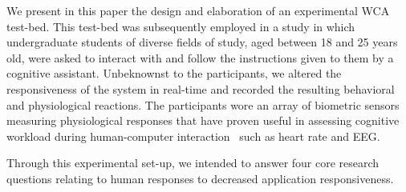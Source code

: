 We present in this paper the design and elaboration of an experimental WCA test-bed.
This test-bed was subsequently employed in a study in which undergraduate students of diverse fields of study, aged between 18 and 25 years old, were asked to interact with and follow the instructions given to them by a cognitive assistant.
Unbeknownst to the participants, we altered the responsiveness of the system in real-time and recorded the resulting behavioral and physiological reactions. 
The participants wore an array of biometric sensors measuring physiological responses that have proven useful in assessing cognitive workload during human-computer interaction~\cite{haapalainen2010psycho,kumar2016measurement} such as heart rate and EEG.\@

Through this experimental set-up, we intended to answer four core research questions relating to human responses to decreased application responsiveness.

